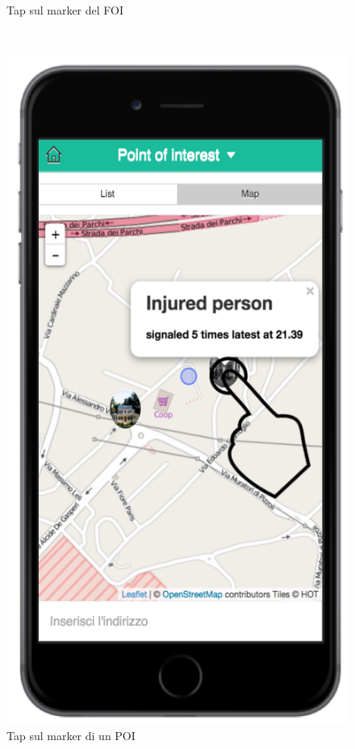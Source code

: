 \begin{figure}
\begin{minipage}[b]{6cm}
	\caption{Tap sul marker del FOI }
	\label{fig:tapmarker}
 \end{minipage}
 \ \hspace{6 mm} \hspace{7 mm} \
 \begin{minipage}[b]{6cm}
\centering
\includegraphics[scale=0.9]{interfaccia/tappoimarker.png}
	\caption{Tap sul marker di un POI }
	\label{fig:poilist}
 \end{minipage}
\end{figure}





	